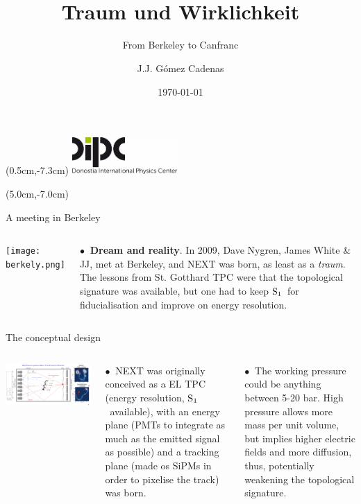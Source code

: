 \documentclass [aspectratio=169]{beamer}
\title[]{\vspace{60pt} \\
Traum und Wirklichkeit} %
\subtitle{From Berkeley to Canfranc}
\author[]{J.J. Gómez Cadenas}
\institute[]{Donostia International Physics Center}
\date{\today}
\newcommand{\so}{\ensuremath{\rm S_1}}
\begin{document}
{
\begin{frame}
    \titlepage
    \begin{textblock*}{4cm}(0.5cm,-7.3cm)
        \includegraphics[width=4cm]{dipc.png}
    \end{textblock*}
    \begin{textblock*}{8cm}(5.0cm,-7.0cm)
        \huge {} %
    \end{textblock*}
\end{frame}
}

\begin{frame}{A meeting in Berkeley}

\begin{columns}
\texttt{[image: berkely.png]}


$\bullet~$ {\bf Dream and reality}. In 2009, Dave Nygren, James White \& JJ, met at Berkeley, and NEXT was born, as least as a {\em traum}. The lessons from St. Gotthard TPC were that the topological signature was available, but one had to keep \so\ for fiducialisation and improve on energy resolution.    

\end{columns}
\end{frame}


\begin{frame}{The conceptual design}

\begin{columns}
\includegraphics[scale=0.14]{nexttraum.png}


$\bullet~$ NEXT  was originally conceived as a EL TPC (energy resolution, \so\ available), with an energy plane (PMTs to integrate as much as the emitted signal as possible) and a tracking plane (made os SiPMs in order to pixelise the track) was born.  

$\bullet~$ The working pressure could be anything between 5-20 bar. High pressure allows more mass per unit volume, but implies higher electric fields and more diffusion, thus, potentially weakening the topological signature. 

\end{columns}
\end{frame}
\end{document}
